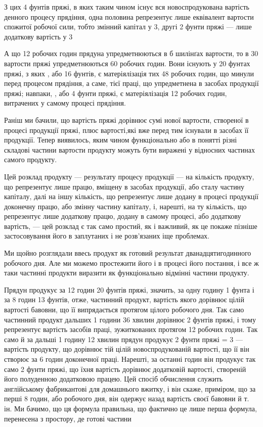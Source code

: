 З цих 4 фунтів пряжі, в яких таким чином існує вся новоспродукована вартість денного процесу
прядіння, одна половина репрезентує лише еквівалент вартости спожитої робочої сили, тобто змінний капітал у 3, другі
2 фунти пряжі — лише додаткову вартість у 3

А що 12 робочих годин прядуна упредметнюються в б шилінґах вартости, то в 30 вартости пряжі
упредметнюються 60 робочих годин. Вони існують у 20 фунтах пряжі, з яких ,
або 16 фунтів, є матеріялізація тих 48 робочих годин, що минули перед процесом прядіння, а саме,
тієї праці, що упредметнена в засобах продукції пряжі; навпаки, , або 4 фунти пряжі, є
матеріялізація 12 робочих годин, витрачених у самому процесі прядіння.

Раніш ми бачили, що вартість пряжі дорівнює сумі нової вартости, створеної в процесі продукції
пряжі, плюс вартості,які вже перед тим існували в засобах її продукції. Тепер виявилось, яким чином функціонально або в
понятті різні складові
частини вартости продукту можуть бути виражені у відносних частинах самого продукту.

Цей розклад продукту — результату процесу продукції — на кількість продукту, що репрезентує лише
працю, вміщену в
засобах продукції, або сталу частину капіталу, далі на іншу кількість, що репрезентує лише додану в
процесі продукції доконечну працю, або змінну частину капіталу, і, нарешті, на ту
кількість, що репрезентує лише додаткову працю, додану в самому процесі, або додаткову вартість, —
цей розклад є так само простий, як і важливий, як це покаже пізніше застосовування його в заплутаних
і не розв’язаних іще проблемах.

Ми щойно розглядали ввесь продукт як готовий результат дванадцятигодинного робочого дня. Але ми
можемо простежити
його і в процесі його постання, і все ж таки частинні продукти виразити як функціонально відмінні
частини продукту.

Прядун продукує за 12 годин 20 фунтів пряжі, значить, за одну годину 1 фунта і за 8 годин 13
фунтів, отже, частинний
продукт, вартість якого дорівнює цілій вартості бавовни, що її випрядається протягом цілого робочого
дня. Так само частинний продукт дальших 1 години 36 хвилин дорівнює 2 фунтів пряжі,
і тому репрезентує вартість засобів праці, зужиткованих протягом 12 робочих годин. Так само й за
дальші 1 годину 12 хвилин
прядун продукує 2 фунти пряжі = 3 — вартість продукту, що дорівнює тій цілій
новоспродукованій вартості, що її він створює за 6 годин доконечної праці. Нарешті, за останні 
годин він продукує так само 2 фунти пряжі, що їхня вартість дорівнює додатковій вартості, створеній
його полуденною додатковою працею. Цей спосіб обчислення служить англійському фабрикантові для домашнього вжитку, і він скаже,
приміром, що за перші 8 годин, або  робочого дня, він одержує назад вартість своєї бавовни
й т. ін. Ми бачимо, що ця формула правильна, що фактично це лише перша формула, перенесена з
простору, де готові частини
\parbreak{}  %
